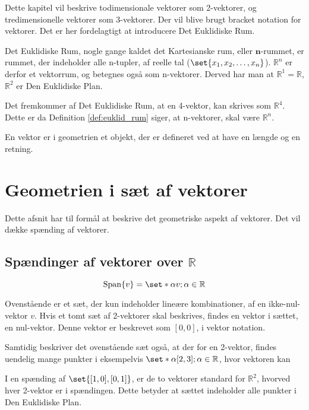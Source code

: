 Dette kapitel vil beskrive todimensionale vektorer som 2-vektorer, og tredimensionelle vektorer som 3-vektorer. Der vil blive brugt bracket notation for vektorer. Det er her fordelagtigt at introducere Det Euklidiske Rum.
\begin{frdef}\label{def:euklid_rum}
	Det Euklidiske Rum, nogle gange kaldet det Kartesianske rum, eller $\mathbf{n}$-rummet, er rummet, der indeholder alle n-tupler, af reelle tal ($\set{x_1,x_2,\dots,x_n}$). $\mathbb{R}^n$ er derfor et vektorrum, og betegnes også som n-vektorer. Derved har man at $\mathbb{R}^1=\mathbb{R}$, $\mathbb{R}^2$ er Den Euklidiske Plan.
\end{frdef}

Det fremkommer af Det Euklidiske Rum, at en 4-vektor, kan skrives som $\mathbb{R}^4$. Dette er da Definition \ref{def:euklid_rum} siger, at n-vektorer, skal være $\mathbb{R}^n$.

\begin{frdef}[Vektorer]
	En vektor er i geometrien et objekt, der er defineret ved at have en længde og en retning.
\end{frdef}


\section{Geometrien i sæt af vektorer}
Dette afsnit har til formål at beskrive det geometriske aspekt af vektorer. Det vil dække spænding af vektorer. 

\subsection{Spændinger af vektorer over $\mathbb{R}$}
 
\begin{equation}
	\mathrm{Span}\{v\}=\set*{\alpha v; \alpha\in\mathbb{R}}
\end{equation}

Ovenstående er et sæt, der kun indeholder lineære kombinationer, af en ikke-nul-vektor $v$.
Hvis et tomt sæt af 2-vektorer skal beskrives, findes en vektor i sættet, en nul-vektor. Denne vektor er beskrevet som $[0,0]$, i vektor notation.

Samtidig beskriver det ovenstående sæt også, at der for en 2-vektor, findes uendelig mange punkter i eksempelvis $\set*{\alpha[2,3]; \alpha\in\mathbb{R}}$, hvor vektoren kan 

I en spænding af $\set{[1,0],[0,1]}$, er de to vektorer standard for $\mathbb{R}^2$, hvorved hver 2-vektor er i spændingen. Dette betyder at sættet indeholder alle punkter i Den Euklidiske Plan.

